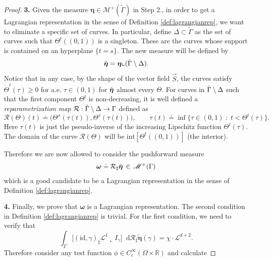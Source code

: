 \documentclass[11pt, twoside, reqno]{amsart}
\theoremstyle{definition}
\theoremstyle{remark}
\numberwithin{equation}{section}
\newcommand*\dif{\mathop{}\!\mathrm{d}}
\newcommand{\mc}[1]{\mathcal{#1}}
\newcommand{\mr}[1]{\mathrm{#1}}
\newcommand{\bs}[1]{\boldsymbol{#1}}
\newcommand{\msc}[1]{\mathscr{#1}}
\newcommand{\wt}[1]{\widetilde{#1}}
\begin{document}
\begin{proof}
\vspace{0.3cm}
\textbf{3.}  Given the measure $\boldsymbol{\eta} \in \mathscr M^+(\wt \Gamma)$ in Step 2., in order to get a Lagrangian representation in the sense of Definition \ref{def:lagrangianrep}, we want to eliminate a specific set of  curves. In particular, define $\Delta \subset \wt \Gamma$  as the set of curves such that $\Theta^t((0,1))$ is a singleton. These are the curves whose support is contained  on an hyperplane $\{t = s\}$. The new measure will be defined by 
$$
\Tilde{\boldsymbol{\eta}}  =\boldsymbol{\eta} \llcorner (\Tilde{\Gamma} \setminus \Delta).
$$
Notice that in any case, by the shape of the vector field $\vec S$, the curves satisfy $\dot \Theta^t(\tau) \geq 0$ for a.e. $\tau \in (0,1)$ for $\Tilde{\boldsymbol{\eta}}$ almost every $\Theta$. 
For curves in $\Tilde{\Gamma} \setminus \Delta$ such that the first component $\Theta^t$ is non-decreasing, it is well defined a \textit{reparametrization map} $\mc R :\Tilde{\Gamma} \setminus \Delta \to \Gamma$ defined as
\begin{equation}
    \mc R(\Theta)(t) \doteq \big(\Theta^x(\tau(t)), \Theta^v(\tau(t))\big) , \qquad \tau(t) \doteq \inf \{ \tau  \in (0,1) \; : \; t < \Theta^t(\tau)\}.
\end{equation}
Here $\tau(t)$ is just the pseudo-inverse of the increasing Lipschitz function $\Theta^t(\tau)$. The domain of the curve $ \mc R (\Theta)$ will be $\mr{int}[\Theta^t((0, 1))]$ (the interior).   

Therefore we are now allowed to consider the pushforward measure $$\boldsymbol{\omega} \doteq \mc R_{\sharp} \Tilde{\boldsymbol{\eta}}\, \in \, \mathscr M^+(\Gamma)$$  which is a good candidate to be a Lagrangian representation in the sense of Definition \ref{def:lagrangianrep}.

\vspace{0.3cm}
\textbf{4.} Finally, we prove that $\bs \omega$ is a Lagrangian representation. The second condition in Definition \ref{def:lagrangianrep} is trivial. For the first condition, we need to verify that 
\begin{equation}
   \int_{\Gamma}  \big[(\mr{id}, \gamma)_{\sharp} \msc L^1 \llcorner I_{\gamma}\big] \dif  \mc R_{\sharp} \wt{\boldsymbol{\eta}}(\gamma)= \chi \cdot \msc L^{d+2}.
\end{equation}
Therefore consider any  test function $\phi \in C^\infty_c(\Omega \times \mathbb R)$ and calculate


\end{proof}
\end{document}

